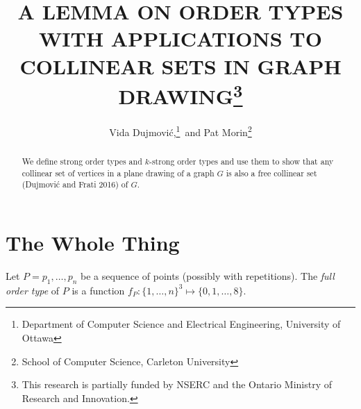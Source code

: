\documentclass{patmorin}
\title{\MakeUppercase{A Lemma on Order Types with Applications to Collinear Sets in Graph Drawing}\thanks{This research is partially funded by NSERC and the Ontario Ministry of Research and Innovation.}}
\author{Vida Dujmovi\'c,\thanks{Department of Computer Science and Electrical Engineering, University of Ottawa}\, and Pat Morin\thanks{School of Computer Science, Carleton University}}
\begin{document}
\maketitle


\begin{abstract}
  We define strong order types and $k$-strong order types and use them to
  show that any collinear set of vertices in a plane drawing of a graph
  $G$ is also a free collinear set (Dujmovi\'c and Frati 2016) of $G$.
\end{abstract}


\section{The Whole Thing}

Let $P=p_1,\ldots,p_n$ be a sequence of points (possibly with repetitions).  The \emph{full order type} of $P$ is a function $f_P\colon \{1,\ldots,n\}^3\mapsto \{0,1,\ldots,8\}$.
\end{document}

